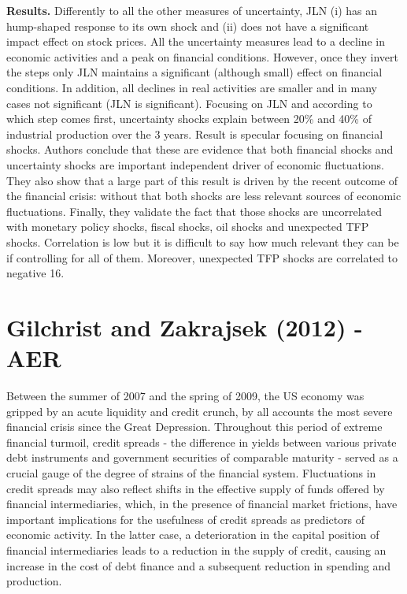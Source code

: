\documentclass{article}
\begin{document}
{\textbf{Results.} Differently to all the other measures of uncertainty, JLN (i) has an hump-shaped response to its own shock and (ii) does not have a significant impact effect on stock prices. All the uncertainty measures lead to a decline in economic activities and a peak on financial conditions. However, once they invert the steps only JLN maintains a significant (although small) effect on financial conditions. In addition, all declines in real activities are smaller and in many cases not significant (JLN is significant). Focusing on JLN and according to which step comes first, uncertainty shocks explain between 20\% and 40\% of industrial production over the 3 years. Result is specular focusing on financial shocks. Authors conclude that these are evidence that both financial shocks and uncertainty shocks are important independent driver of economic fluctuations. They also show that a large part of this result is driven by the recent outcome of the financial crisis: without that both shocks are less relevant sources of economic fluctuations. Finally, they validate the fact that those shocks are uncorrelated with monetary policy shocks, fiscal shocks, oil shocks and unexpected TFP shocks. Correlation is low but it is difficult to say how much relevant they can be if controlling for all of them. Moreover, unexpected TFP shocks are correlated to negative 16.   



\section*{Gilchrist and Zakrajsek (2012) - AER}

Between the summer of 2007 and the spring of 2009, the US economy was gripped by an acute liquidity and credit crunch, by all accounts the most severe financial crisis since the Great Depression. Throughout this period of extreme financial turmoil, credit spreads - the difference in yields between various private debt instruments and government securities of comparable maturity - served as a crucial gauge of the degree of strains of the financial system. Fluctuations in credit spreads may also reflect shifts in the effective supply of funds offered by financial intermediaries, which, in the presence of financial market frictions, have important implications for the usefulness of credit spreads as predictors of economic activity. In the latter case, a deterioration in the capital position of financial intermediaries leads to a reduction in the supply of credit, causing an increase in the cost of debt finance and a subsequent reduction in spending and production. 

}
\end{document}
